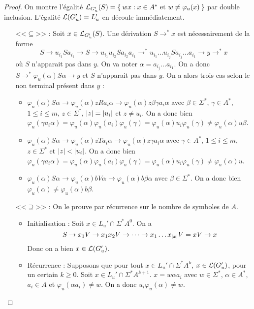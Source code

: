 \documentclass[11pt,a4paper]{article}
\theoremstyle{plain}
\theoremstyle{definition}
\theoremstyle{definition}
\theoremstyle{remark}
\theoremstyle{remark}
\theoremstyle{plain}
\theoremstyle{plain}
\theoremstyle{plain}
\theoremstyle{remark}
\begin{document}
\begin{proof}
	On montre l'égalité $\mathcal{L}_{G_u'}(S) = \Set{wx : x \in A^*\text{ et } w\not=\varphi_u(x)}$ par double inclusion. L'égalité $\mathcal{L}(G_u')= L_u'$ en découle immédiatement.
	\begin{itemize}
		\item[<<$\subseteq$>>] : Soit $x\in \mathcal{L}_{G_u'}(S)$. Une dérivation $S\to^* x$ est nécessairement de la forme $$\displaystyle S\to u_{i_1}Sa_{i_1}\to S\to u_{i_1}u_{i_2}Sa_{i_2}a_{i_1}\to^* u_{i_1}\dots u_{i_j}Sa_{i_j}\dots a_{i_1}\to y \to^* x$$ où $S$ n'apparait pas dans $y$. On va noter $\alpha=a_{i_j}\dots a_{i_1}$. On a donc $S\to^*\varphi_u(\alpha)S\alpha\to y$ et $S$ n'apparait pas dans $y$. On a alors trois cas selon le non terminal présent dans $y$ :
		\begin{itemize}
			\item $\varphi_u(\alpha)S\alpha\to \varphi_u(\alpha)zRa_i\alpha\to \varphi_u(\alpha)z\beta\gamma a_i\alpha$ avec $\beta\in \Sigma^*$, $\gamma\in A^*$, $1\le i \le m$, $z\in\Sigma^*$, $\left|z\right|=\left|u_i\right|$ et $z\not=u_i$. On a donc bien $\varphi_u(\gamma a_i\alpha)=\varphi_u(\alpha)\varphi_u(a_i)\varphi_u(\gamma)=\varphi_u(\alpha)u_i\varphi_u(\gamma)\not=\varphi_u(\alpha)u\beta$.
			\item $\varphi_u(\alpha)S\alpha\to \varphi_u(\alpha)zTa_i\alpha\to \varphi_u(\alpha)z\gamma a_i\alpha$ avec $\gamma\in A^*$, $1\le i \le m$, $z\in\Sigma^*$ et $\left|z\right|<\left|u_i\right|$. On a donc bien $\varphi_u(\gamma a_i\alpha)=\varphi_u(\alpha)\varphi_u(a_i)\varphi_u(\gamma)=\varphi_u(\alpha)u_i\varphi_u(\gamma)\not=\varphi_u(\alpha)u$.
			\item $\varphi_u(\alpha)S\alpha\to \varphi_u(\alpha)bV\alpha\to \varphi_u(\alpha)b\beta \alpha$ avec $\beta\in \Sigma^*$. On a donc bien $\varphi_u(\alpha)\not=\varphi_u(\alpha)b\beta$.
		\end{itemize}
		\item[<<$\supseteq$>>] : On le prouve par récurrence sur le nombre de symboles de $A$.
		\begin{itemize}
			\item Initialisation : Soit $x\in L_u'\cap\Sigma^*A^0$. On a
			$$S\to x_1V \to x_1x_2V\to \dots \to x_1\dots x_{\left|x\right|}V=xV\to x$$
			Donc on a bien $x\in \mathcal{L}(G_u')$.
			\item Récurrence : Supposons que pour tout $x\in L_u'\cap\Sigma^*A^k$, $x\in \mathcal{L}(G_u')$, pour un certain $k\ge 0$. Soit $x \in L_u'\cap\Sigma^*A^{k+1}$. $x=w\alpha a_i$ avec $w\in\Sigma^*$, $\alpha\in A^*$, $a_i\in A$ et $\varphi_u(\alpha a_i)\not= w$. On a donc $u_i\varphi_u(\alpha)\not= w$.

\end{itemize}
\end{itemize}
\end{proof}
\end{document}
